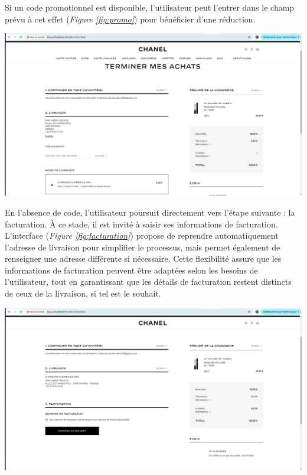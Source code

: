 Si un code promotionnel est disponible, l'utilisateur peut l'entrer dans le champ prévu à cet effet (\textit{Figure \ref{fig:promo}}) pour bénéficier d'une réduction. 
\begin{center}
    \centering
    \includegraphics[width=19cm]{Figures/Screens/code prommo.png}
    \label{fig:promo}
\end{center}
En l'absence de code, l'utilisateur poursuit directement vers l'étape suivante : la facturation. À ce stade, il est invité à saisir ses informations de facturation. L'interface (\textit{Figure \ref{fig:facturation}}) propose de reprendre automatiquement l'adresse de livraison pour simplifier le processus, mais permet également de renseigner une adresse différente si nécessaire. Cette flexibilité assure que les informations de facturation peuvent être adaptées selon les besoins de l'utilisateur, tout en garantissant que les détails de facturation restent distincts de ceux de la livraison, si tel est le souhait.
\begin{center}
    \centering
    \includegraphics[width=19cm]{Figures/Screens/passe au facturation.png}
    \label{fig:facturation}
\end{center}

